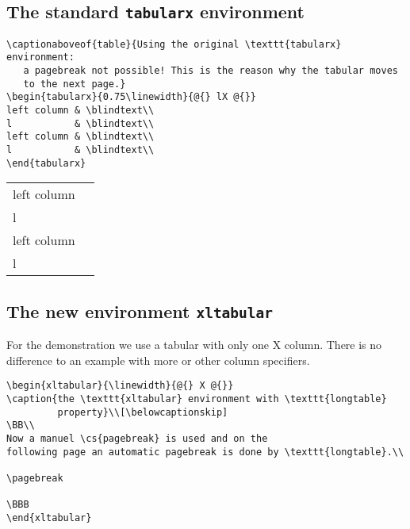\documentclass[paper=a4,fontsize=11pt,DIV=13,parskip=half-,
               captions=tableabove,twoside=on]{scrartcl}
\newcommand*\cs[1]{\texttt{\textbackslash#1}}
\begin{document}
\vspace{1cm}


\subsection{The standard \texttt{tabularx} environment}

\begin{Verbatim}[frame=lines]
\captionaboveof{table}{Using the original \texttt{tabularx} environment: 
   a pagebreak not possible! This is the reason why the tabular moves 
   to the next page.}
\begin{tabularx}{0.75\linewidth}{@{} lX @{}}
left column & \blindtext\\
l           & \blindtext\\
left column & \blindtext\\
l           & \blindtext\\
\end{tabularx}
\end{Verbatim}

\begin{tabularx}{0.75\linewidth}{@{} lX @{}}
	left column & \blindtext\\
	l           & \blindtext\\
	left column & \blindtext\\
	l           & \blindtext\\
\end{tabularx}



\clearpage

\subsection{The new environment \texttt{xltabular}}
For the demonstration we use a tabular with only one X column. There is no difference
to an example with more or other column specifiers.

\begin{Verbatim}[frame=lines]
\begin{xltabular}{\linewidth}{@{} X @{}}
\caption{the \texttt{xltabular} environment with \texttt{longtable} 
         property}\\[\belowcaptionskip]
\BB\\
Now a manuel \cs{pagebreak} is used and on the
following page an automatic pagebreak is done by \texttt{longtable}.\\

\pagebreak

\BBB
\end{xltabular}
\end{Verbatim}
\end{document}
